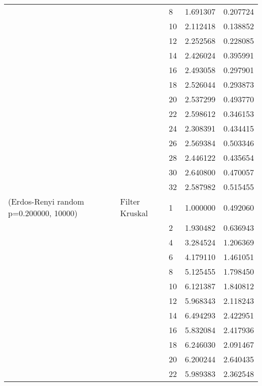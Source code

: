 \begin{tabular}{lllrr}
                      &            & 8  &  1.691307 &  0.207724 \\
                      &            & 10 &  2.112418 &  0.138852 \\
                      &            & 12 &  2.252568 &  0.228085 \\
                      &            & 14 &  2.426024 &  0.395991 \\
                      &            & 16 &  2.493058 &  0.297901 \\
                      &            & 18 &  2.526044 &  0.293873 \\
                      &            & 20 &  2.537299 &  0.493770 \\
                      &            & 22 &  2.598612 &  0.346153 \\
                      &            & 24 &  2.308391 &  0.434415 \\
                      &            & 26 &  2.569384 &  0.503346 \\
                      &            & 28 &  2.446122 &  0.435654 \\
                      &            & 30 &  2.640800 &  0.470057 \\
                      &            & 32 &  2.587982 &  0.515455 \\
(Erdos-Renyi random p=0.200000, 10000) & Filter Kruskal & 1  &  1.000000 &  0.492060 \\
                      &            & 2  &  1.930482 &  0.636943 \\
                      &            & 4  &  3.284524 &  1.206369 \\
                      &            & 6  &  4.179110 &  1.461051 \\
                      &            & 8  &  5.125455 &  1.798450 \\
                      &            & 10 &  6.121387 &  1.840812 \\
                      &            & 12 &  5.968343 &  2.118243 \\
                      &            & 14 &  6.494293 &  2.422951 \\
                      &            & 16 &  5.832084 &  2.417936 \\
                      &            & 18 &  6.246030 &  2.091467 \\
                      &            & 20 &  6.200244 &  2.640435 \\
                      &            & 22 &  5.989383 &  2.362548 \\

\end{tabular}
